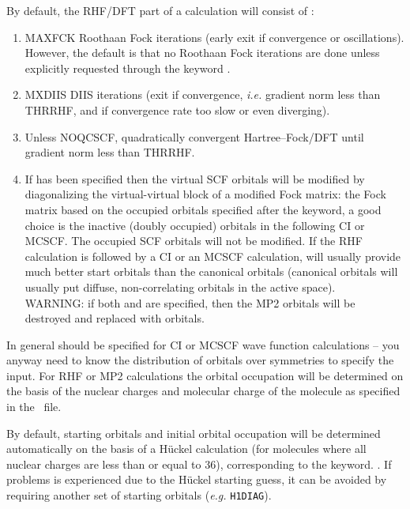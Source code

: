 
By default, the RHF/DFT part of a calculation will consist of :
\begin{enumerate}
\item {MAXFCK Roothaan Fock iterations (early exit if convergence
    or oscillations). However, the default is that no Roothaan Fock
iterations are done unless explicitly requested through the keyword
.
}
\item {MXDIIS DIIS iterations (exit if convergence, {\it i.e.\/} gradient norm
    less than THRRHF, and if convergence rate too slow or even diverging).
}
\item {Unless NOQCSCF, quadratically convergent Hartree--Fock/DFT until
    gradient norm less than THRRHF.
}
\item{If  has been specified
    then the virtual SCF orbitals will be modified by diagonalizing
    the virtual-virtual block of
    a modified Fock matrix: the Fock matrix
    based on the occupied orbitals specified after the keyword, a
    good choice is the inactive (doubly occupied) orbitals in the
    following CI or MCSCF.
    The occupied SCF orbitals will not be modified.
    If the RHF calculation is followed by a CI or an MCSCF calculation,
     will usually provide much
    better start orbitals than the canonical orbitals (canonical
    orbitals will usually put diffuse, non-correlating orbitals in the
    active space). \\
    WARNING: if both  and  are specified,
    then the MP2 orbitals will be destroyed and replaced with 
    orbitals.
}
\end{enumerate}

In general  should be specified for CI or MCSCF
wave function calculations -- you anyway need to know the distribution
of orbitals over symmetries to specify the  input.
For RHF
or MP2
calculations the orbital occupation will be determined on the
basis of the nuclear charges and molecular charge of the molecule as
specified in the \molinp\ file.

By default, starting orbitals and initial orbital occupation will
be determined automatically on the basis of a H\"{u}ckel
calculation (for molecules where all nuclear charges are
less than or equal to 36), corresponding to the  keyword.
.
If problems is experienced due to the
H\"{u}ckel starting guess, it can be avoided by requiring another set of
starting orbitals ({\it e.g.\/} \verb|H1DIAG|).

